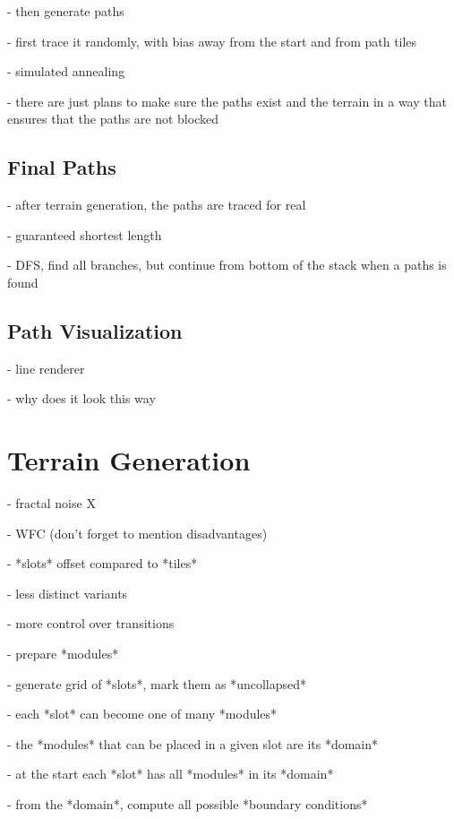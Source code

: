 - then generate paths

- first trace it randomly, with bias away from the start and from path tiles

- simulated annealing

- there are just plans to make sure the paths exist and the terrain in a way that ensures that the paths are not blocked

\subsection{Final Paths}

- after terrain generation, the paths are traced for real

- guaranteed shortest length

- DFS, find all branches, but continue from bottom of the stack when a paths is found

\subsection{Path Visualization}

- line renderer \checkmark

- why does it look this way

\section{Terrain Generation}

- fractal noise X

- WFC \checkmark (don't forget to mention disadvantages)



- *slots* offset compared to *tiles*

- less distinct variants

- more control over transitions

- prepare *modules*

- generate grid of *slots*, mark them as *uncollapsed*

- each *slot* can become one of many *modules*

- the *modules* that can be placed in a given slot are its *domain*

- at the start each *slot* has all *modules* in its *domain*

- from the *domain*, compute all possible *boundary conditions*

